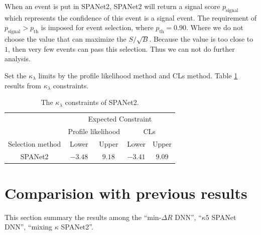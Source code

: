 \documentclass[12pt]{article}
\begin{document}
		When an event is put in SPANet2, SPANet2 will return a signal score $p_\text{signal}$ which represents the confidence of this event is a signal event. The requirement of $p_\text{signal} > p_\text{th}$ is imposed for event selection, where $p_\text{th} = 0.90$. Where we do not choose the value that can maximize the $S / \sqrt{B}$. Because the value is too close to $1$, then very few events can pass this selection. Thus we can not do further analysis.  

		Set the $\kappa_\lambda$ limits by the profile likelihood method and CLs method. Table \ref{tab:kappa_constraint_SPANet} results from $\kappa_\lambda$ constraints.
		\begin{table}[htpb]
			\centering
			\caption{The $\kappa_\lambda$ constraints of SPANet2.}
			\label{tab:kappa_constraint_SPANet}
			\begin{tabular}{c|cc|cc}
								  & \multicolumn{4}{c}{Expected Constraint}                          \\
								  & \multicolumn{2}{c}{Profile likelihood} & \multicolumn{2}{c}{CLs} \\ \hline
			Selection method        & Lower              & Upper             & Lower      & Upper      \\ \hline
			SPANet2      & $-3.48$            & $9.18$             & $-3.41$      & $9.09$      \\
			\end{tabular}
		\end{table}

		
\section{Comparision with previous results}%
\label{sec:comparision_with_previous_results}
	This section summary the results among the ``$\text{min-}\Delta R$ DNN'', ``$\kappa 5$ SPANet DNN'', ``mixing $\kappa$ SPANet2''.
\end{document}
